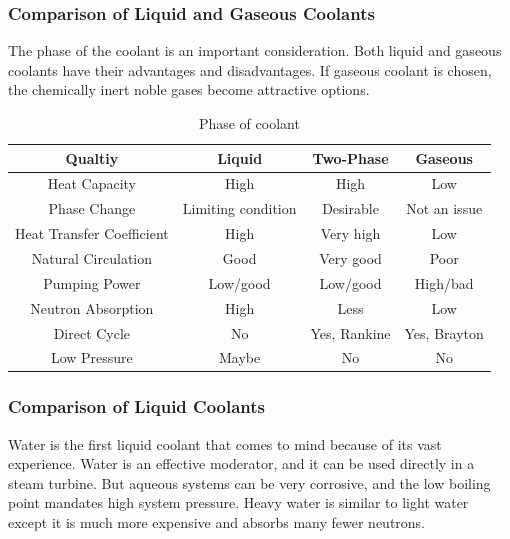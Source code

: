 
\subsubsection{Comparison of Liquid and Gaseous Coolants}
The phase of the coolant is an important consideration. Both liquid and gaseous coolants have their advantages and disadvantages.
If gaseous coolant is chosen, the chemically inert noble gases become attractive options.

\begin{table}[!ht]
\begin{tabular}{c|c|c|c}
  Qualtiy & Liquid & Two-Phase & Gaseous \\
  \hline
  Heat Capacity & High & High & Low \\
  Phase Change & Limiting condition & Desirable & Not an issue \\
  Heat Transfer Coefficient & High & Very high & Low \\
  Natural Circulation & Good & Very good & Poor \\
  Pumping Power & Low/good & Low/good & High/bad\\
  Neutron Absorption & High & Less & Low\\
  Direct Cycle & No & Yes, Rankine & Yes, Brayton\\
  Low Pressure & Maybe & No & No\\
  \hline
\end{tabular}
\caption{Phase of coolant}
\end{table}

\subsubsection{Comparison of Liquid Coolants}
Water is the first liquid coolant that comes to mind because of its vast experience.
Water is an effective moderator, and it can be used directly in a steam turbine.
But aqueous systems can be very corrosive, and the low boiling point mandates high system pressure.
Heavy water is similar to light water except it is much more expensive and absorbs many fewer neutrons.

